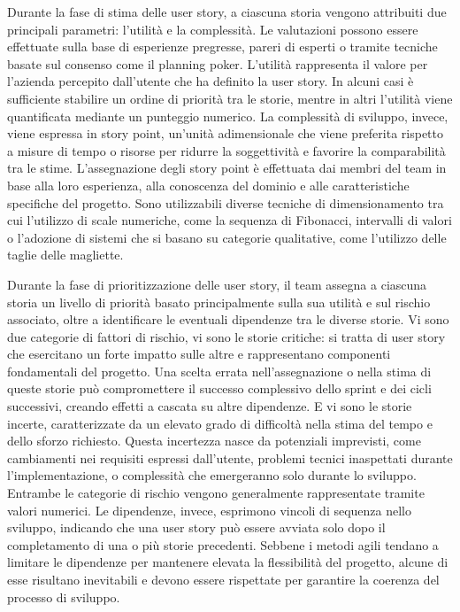 \documentclass[12pt,a4paper,openright,twoside]{book}
\begin{document}
Durante la fase di stima delle user story, a ciascuna storia vengono attribuiti due principali parametri: l’utilità e la complessità. Le valutazioni possono essere effettuate sulla base di esperienze pregresse, pareri di esperti o tramite tecniche basate sul consenso come il planning poker. L’utilità rappresenta il valore per l'azienda percepito dall’utente che ha definito la user story. In alcuni casi è sufficiente stabilire un ordine di priorità tra le storie, mentre in altri l’utilità viene quantificata mediante un punteggio numerico. La complessità di sviluppo, invece, viene espressa in story point, un’unità adimensionale che viene preferita rispetto a misure di tempo o risorse per ridurre la soggettività e favorire la comparabilità tra le stime. L’assegnazione degli story point è effettuata dai membri del team in base alla loro esperienza, alla conoscenza del dominio e alle caratteristiche specifiche del progetto. Sono utilizzabili diverse tecniche di dimensionamento \cite{cohn2005agile} tra cui l'utilizzo di scale numeriche, come la sequenza di Fibonacci, intervalli di valori o l'adozione di sistemi che si basano su categorie qualitative, come l'utilizzo delle taglie delle magliette.

\vspace{1em}

Durante la fase di prioritizzazione delle user story, il team assegna a ciascuna storia un livello di priorità basato principalmente sulla sua utilità e sul rischio associato, oltre a identificare le eventuali dipendenze tra le diverse storie. Vi sono due categorie di fattori di rischio, vi sono le storie critiche: si tratta di user story che esercitano un forte impatto sulle altre e rappresentano componenti fondamentali del progetto. Una scelta errata nell'assegnazione o nella stima di queste storie può compromettere il successo complessivo dello sprint e dei cicli successivi, creando effetti a cascata su altre dipendenze. E vi sono le storie incerte, caratterizzate da un elevato grado di difficoltà nella stima del tempo e dello sforzo richiesto. Questa incertezza nasce da potenziali imprevisti, come cambiamenti nei requisiti espressi dall'utente, problemi tecnici inaspettati durante l'implementazione, o complessità che emergeranno solo durante lo sviluppo. Entrambe le categorie di rischio vengono generalmente rappresentate tramite valori numerici. Le dipendenze, invece, esprimono vincoli di sequenza nello sviluppo, indicando che una user story può essere avviata solo dopo il completamento di una o più storie precedenti. Sebbene i metodi agili tendano a limitare le dipendenze per mantenere elevata la flessibilità del progetto, alcune di esse risultano inevitabili e devono essere rispettate per garantire la coerenza del processo di sviluppo.
\end{document}
